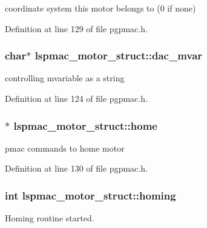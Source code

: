 coordinate system this motor belongs to (0 if none) 



Definition at line 129 of file pgpmac.\-h.

\hypertarget{structlspmac__motor__struct_a05dff021221abbc1bf656039fffb3275}{
\subsubsection[{dac\-\_\-mvar}]{\setlength{\rightskip}{0pt plus 5cm}char$\ast$ lspmac\-\_\-motor\-\_\-struct\-::dac\-\_\-mvar}}\label{structlspmac__motor__struct_a05dff021221abbc1bf656039fffb3275}


controlling mvariable as a string 



Definition at line 124 of file pgpmac.\-h.

\hypertarget{structlspmac__motor__struct_a6dc1ceab86687f741d4c4a574501959c}{
\subsubsection[{home}]{$\ast$ lspmac\-\_\-motor\-\_\-struct\-::home}}\label{structlspmac__motor__struct_a6dc1ceab86687f741d4c4a574501959c}


pmac commands to home motor 



Definition at line 130 of file pgpmac.\-h.

\hypertarget{structlspmac__motor__struct_aa74108855693f94fc2ff76333c9fb6ac}{
\subsubsection[{homing}]{\setlength{\rightskip}{0pt plus 5cm}int lspmac\-\_\-motor\-\_\-struct\-::homing}}\label{structlspmac__motor__struct_aa74108855693f94fc2ff76333c9fb6ac}


Homing routine started. 



